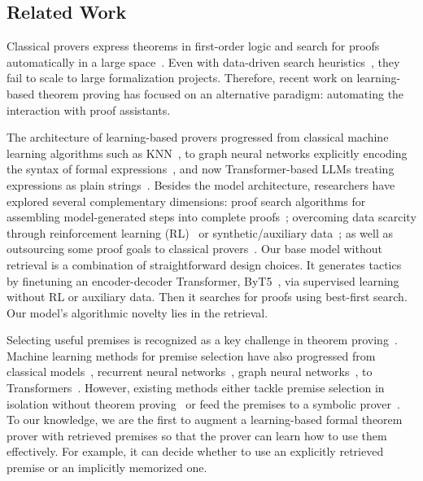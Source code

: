 \subsection{Related Work}

Classical provers express theorems in first-order logic and search for proofs automatically in a large space~\cite{robinson2001handbook,kovacs2013first}. Even with data-driven search heuristics~\cite{loos2017deep,bridge2014machine}, they fail to scale to large formalization projects. Therefore, recent work on learning-based theorem proving has focused on an alternative paradigm: automating the interaction with proof assistants. 

The architecture of learning-based provers progressed from classical machine learning algorithms such as KNN~\cite{gauthier2021tactictoe}, to graph neural networks explicitly encoding the syntax of formal expressions~\cite{yang2019learning,paliwal2020graph}, and now Transformer-based LLMs treating expressions as plain strings~\cite{polu2020generative}. Besides the model architecture, researchers have explored several complementary dimensions: proof search algorithms for assembling model-generated steps into complete proofs~\cite{lample2022hypertree,wang2023dt}; overcoming data scarcity through reinforcement learning (RL)~\cite{bansal2019learning,wu2021tacticzero,lample2022hypertree,polu2023formal} or synthetic/auxiliary data~\cite{wang2020learning,rabe2021mathematical,wu2021lime,han2022proof}; as well as outsourcing some proof goals to classical provers~\cite{bohme2010sledgehammer,blanchette2016hammering,czajka2018hammer,jiang2022thor}. Our base model without retrieval is a combination of straightforward design choices. It generates tactics by finetuning an encoder-decoder Transformer, ByT5~\cite{xue2022byt5}, via supervised learning without RL or auxiliary data. Then it searches for proofs using best-first search. Our model's algorithmic novelty lies in the retrieval.


Selecting useful premises is recognized as a key challenge in theorem proving~\cite{urban2004mptp,irving2016deepmath,szegedy2021retrieval,wu2022formal}. Machine learning methods for premise selection have also progressed from classical models~\cite{alama2014premise,bohme2010sledgehammer,piotrowski2023machinelearned}, recurrent neural networks~\cite{irving2016deepmath}, graph neural networks~\cite{wang2020learning}, to Transformers~\cite{mikula2023magnushammer,yeh2023coprover}. However, existing methods either tackle premise selection in isolation without theorem proving~\cite{piotrowski2023machinelearned,irving2016deepmath,wang2020learning} or feed the premises to a symbolic prover~\cite{alama2014premise,bohme2010sledgehammer,mikula2023magnushammer}. To our knowledge, we are the first to augment a learning-based formal theorem prover with retrieved premises so that the prover can learn how to use them effectively. For example, it can decide whether to use an explicitly retrieved premise or an implicitly memorized one.


